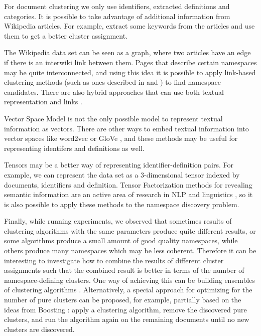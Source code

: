 For document clustering we only use identifiers, extracted definitions 
and categories. It is possible to take advantage of additional information from 
Wikipedia articles. For example, extract some keywords from the articles
and use them to get a better cluster assignment.

The Wikipedia data set can be seen as a graph, where two articles have 
an edge if there is an interwiki link between them. Pages that describe 
certain namespaces may be quite interconnected, and using this idea it is possible 
to apply link-based clustering methods (such as ones described in 
\cite{botafogo1991identifying} and \cite{johnson1996adaptive}) to find namespace 
candidates. There are also hybrid approaches that can use both textual representation 
and links \cite{oikonomakou2005review}.

Vector Space Model is not the only possible model to represent textual 
information as vectors. There are other ways to embed textual information
into vector spaces like word2vec \cite{mikolov2013efficient} or 
GloVe \cite{pennington2014glove}, and these methods may be useful 
for representing identifers and definitions as well.

Tensors may be a better way of representing 
identifier-definition pairs. For example, we can represent the data set 
as a 3-dimensional tensor indexed by documents, identifiers and definition. 
Tensor Factorization methods for revealing semantic information 
are an active area of research in NLP and linguistics \cite{anisimov2014semantic},
so it is also possible to apply these methods to the namespace discovery problem. 

Finally, while running experiments, we observed that sometimes results of
clustering algorithms with the same parameters produce quite different
results, or some algorithms produce a small amount of good quality namespaces,
while others produce many namespaces which may be less coherent.
Therefore it can be interesting to investigate how to combine the results
of different cluster assignments such that the combined result is better
in terms of the number of namespace-defining clusters. One way of
achieving this can be building ensembles of clustering algorithms \cite{strehl2003cluster}.
Alternatively, a special approach for optimizing for the number of pure clusters
can be proposed, for example, partially based on the ideas from
Boosting \cite{freund1996experiments}: apply a clustering algorithm,
remove the discovered pure clusters, and run the algorithm again on the remaining
documents until no new clusters are discovered.



